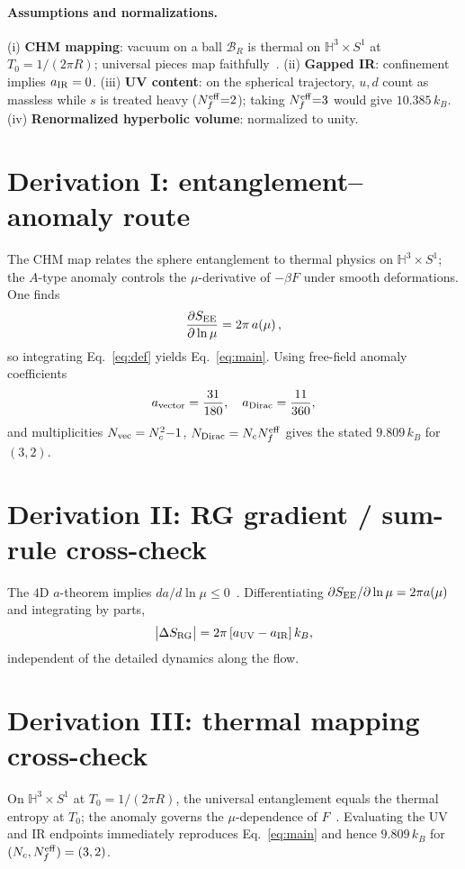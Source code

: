 \documentclass[11pt]{article}
\begin{document}
\paragraph{Assumptions and normalizations.}
(i) \textbf{CHM mapping}: vacuum on a ball $\mathcal{B}_R$ is thermal on $\mathbb{H}^3\times S^1$ at $T_0=1/(2\pi R)$; universal pieces map faithfully~\cite{CHM,Solodukhin,CHfree}. (ii) \textbf{Gapped IR}: confinement implies $a_{\rm IR}=0$. (iii) \textbf{UV content}: on the spherical trajectory, $u,d$ count as massless while $s$ is treated heavy ($N_f^{\rm eff}{=}2$); taking $N_f^{\rm eff}{=}3$ would give $10.385\,k_B$. (iv) \textbf{Renormalized hyperbolic volume}: normalized to unity.

\section{Derivation I: entanglement--anomaly route}
The CHM map relates the sphere entanglement to thermal physics on $\mathbb{H}^3\times S^1$; the $A$-type anomaly controls the $\mu$-derivative of $-\beta F$ under smooth deformations. One finds~\cite{CHM,Solodukhin,MyersSinha}
\begin{equation}
\frac{\partial S_{\rm EE}}{\partial\ln\mu}=2\pi\,a(\mu)\,,
\end{equation}
so integrating Eq.~\eqref{eq:def} yields Eq.~\eqref{eq:main}. Using free-field anomaly coefficients~\cite{Duff,Anselmi}
\begin{equation}
a_{\rm vector}=\frac{31}{180},\quad a_{\rm Dirac}=\frac{11}{360},
\end{equation}
and multiplicities $N_{\rm vec}=N_c^2{-}1$, $N_{\rm Dirac}=N_c N_f^{\rm eff}$ gives the stated $9.809\,k_B$ for $(3,2)$.

\section{Derivation II: RG gradient / sum-rule cross-check}
The $4$D $a$-theorem implies $da/d\ln\mu\le0$~\cite{KomargodskiSchwimmer,Cardy4D,JackOsborn,FreedmanOsborn}. Differentiating $\partial S_{\rm EE}/\partial\ln\mu=2\pi a(\mu)$ and integrating by parts,
\begin{equation}
\big|\Delta S_{\rm RG}\big|=2\pi\,[a_{\rm UV}-a_{\rm IR}]\,k_B,
\end{equation}
independent of the detailed dynamics along the flow.

\section{Derivation III: thermal mapping cross-check}
On $\mathbb{H}^3\times S^1$ at $T_0=1/(2\pi R)$, the universal entanglement equals the thermal entropy at $T_0$; the anomaly governs the $\mu$-dependence of $F$~\cite{CHM,Solodukhin,CHfree}. Evaluating the UV and IR endpoints immediately reproduces Eq.~\eqref{eq:main} and hence $9.809\,k_B$ for $(N_c,N_f^{\rm eff})=(3,2)$.
\end{document}
